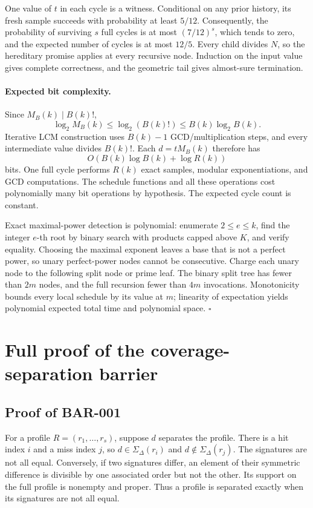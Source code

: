 \documentclass[11pt]{article}
\begin{document}
One value of \(t\) in each cycle is a witness. Conditional on any prior
history, its fresh sample succeeds with probability at least \(5/12\).
Consequently, the probability of surviving \(s\) full cycles is at most
\((7/12)^s\), which tends to zero, and the expected number of cycles is at
most \(12/5\). Every child divides \(N\), so the hereditary promise applies at
every recursive node. Induction on the input value gives complete correctness,
and the geometric tail gives almost-sure termination.

\paragraph{Expected bit complexity.}
Since \(M_B(k)\mid B(k)!\),
\[
\log_2M_B(k)\le\log_2(B(k)!)
\le B(k)\log_2B(k).
\]
Iterative LCM construction uses \(B(k)-1\) GCD/multiplication steps, and every
intermediate value divides \(B(k)!\). Each
\(d=tM_B(k)\) therefore has
\[
O(B(k)\log B(k)+\log R(k))
\]
bits. One full cycle performs \(R(k)\) exact samples, modular
exponentiations, and GCD computations. The schedule functions and all these
operations cost polynomially many bit operations by hypothesis. The expected
cycle count is constant.

Exact maximal-power detection is polynomial: enumerate
\(2\le e\le k\), find the integer \(e\)-th root by binary search with products
capped above \(K\), and verify equality. Choosing the maximal exponent leaves
a base that is not a perfect power, so unary perfect-power nodes cannot be
consecutive. Charge each unary node to the following split node or prime leaf.
The binary split tree has fewer than \(2m\) nodes, and the full recursion fewer
than \(4m\) invocations. Monotonicity bounds every local schedule by its value
at \(m\); linearity of expectation yields polynomial expected total time and
polynomial space. \(\square\)

\section{Full proof of the coverage-separation barrier}

\subsection{Proof of BAR-001}\label{proof:BAR-001}

For a profile \(R=(r_1,\ldots,r_s)\), suppose \(d\) separates the profile.
There is a hit index \(i\) and a miss index \(j\), so
\(d\in\Sigma_\Delta(r_i)\) and
\(d\notin\Sigma_\Delta(r_j)\). The signatures are not all equal.
Conversely, if two signatures differ, an element of their symmetric difference
is divisible by one associated order but not the other. Its support on the
full profile is nonempty and proper. Thus a profile is separated exactly when
its signatures are not all equal.
\end{document}
